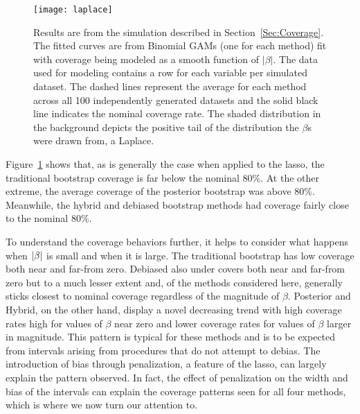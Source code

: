 \begin{figure}[hbtp]
  \begin{center}
  \texttt{[image: laplace]}
  \caption{\label{Fig:laplace} Results are from the simulation described in Section~\ref{Sec:Coverage}. The fitted curves are from Binomial GAMs (one for each method) fit with coverage being modeled as a smooth function of $|\beta|$. The data used for modeling contains a row for each variable per simulated dataset. The dashed lines represent the average for each method across all 100 independently generated datasets and the solid black line indicates the nominal coverage rate. The shaded distribution in the background depicts the positive tail of the distribution the $\beta$s were drawn from, a Laplace.}
  \end{center}
\end{figure}

Figure~\ref{Fig:laplace} shows that, as is generally the case when applied to the lasso, the traditional bootstrap coverage is far below the nominal 80\%. At the other extreme, the average coverage of the posterior bootstrap was above 80\%. Meanwhile, the hybrid and debiased bootstrap methods had coverage fairly close to the nominal 80\%.


To understand the coverage behaviors further, it helps to consider what happens when $\left\lvert\beta\right\rvert$ is small and when it is large. The traditional bootstrap has low coverage both near and far-from zero. Debiased also under covers both near and far-from zero but to a much lesser extent and, of the methods considered here, generally sticks closest to nominal coverage regardless of the magnitude of $\beta$.  Posterior and Hybrid, on the other hand, display a novel decreasing trend with high coverage rates high for values of $\beta$ near zero and lower coverage rates for values of $\beta$ larger in magnitude. This pattern is typical for these methods and is to be expected from intervals arising from procedures that do not attempt to debias. The introduction of bias through penalization, a feature of the lasso, can largely explain the pattern observed. In fact, the effect of penalization on the width and bias of the intervals can explain the coverage patterns seen for all four methods, which is where we now turn our attention to.

 

